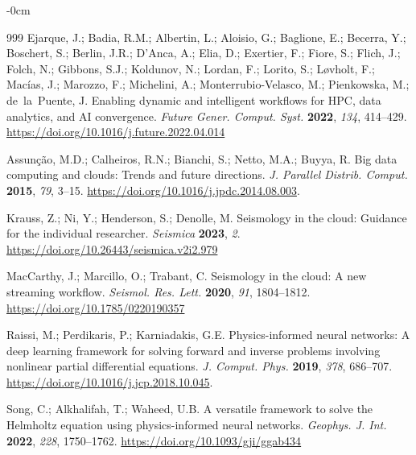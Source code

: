 \documentclass[data,article,accept,pdftex,moreauthors]{Definitions/mdpi}
\begin{document}
\begin{adjustwidth}{-\extralength}{0cm}
\begin{thebibliography}{999}
Ejarque, J.; Badia, R.M.; Albertin, L.; Aloisio, G.; Baglione, E.; Becerra, Y.; Boschert, S.; Berlin, J.R.; D'Anca, A.; Elia, D.; Exertier, F.; Fiore, S.; Flich, J.; Folch, N.; Gibbons, S.J.; Koldunov, N.; Lordan, F.; Lorito, S.; L{\o}vholt, F.; Mac{\'i}as, J.; Marozzo, F.; Michelini, A.; Monterrubio-Velasco, M.; Pienkowska, M.; de~la~Puente, J. Enabling dynamic and intelligent workflows for HPC, data analytics, and AI convergence. \emph{Future Gener. Comput. Syst.} \textbf{2022}, \emph{134}, 414--429. \url{https://doi.org/10.1016/j.future.2022.04.014}

Assunção, M.D.; Calheiros, R.N.; Bianchi, S.; Netto, M.A.; Buyya, R. Big data computing and clouds: Trends and future directions. \emph{J. Parallel Distrib. Comput.} \textbf{2015}, \emph{79}, 3--15. \url{https://doi.org/10.1016/j.jpdc.2014.08.003}.

Krauss, Z.; Ni, Y.; Henderson, S.; Denolle, M. Seismology in the cloud: Guidance for the individual researcher. \emph{Seismica} \textbf{2023}, \emph{2}. \url{https://doi.org/10.26443/seismica.v2i2.979}

MacCarthy, J.; Marcillo, O.; Trabant, C. Seismology in the cloud: A new streaming workflow. \emph{Seismol. Res. Lett.} \textbf{2020}, \emph{91}, 1804--1812. \url{https://doi.org/10.1785/0220190357}

Raissi, M.; Perdikaris, P.; Karniadakis, G.E. Physics-informed neural networks: A deep learning framework for solving forward and inverse problems involving nonlinear partial differential equations. \emph{J. Comput. Phys.} \textbf{2019}, \emph{378}, 686--707. \url{https://doi.org/10.1016/j.jcp.2018.10.045}.

Song, C.; Alkhalifah, T.; Waheed, U.B. A versatile framework to solve the Helmholtz equation using physics-informed neural networks. \emph{Geophys. J. Int.} \textbf{2022}, \emph{228}, 1750--1762. \url{https://doi.org/10.1093/gji/ggab434} %


\end{thebibliography}
\end{adjustwidth}
\end{document}
